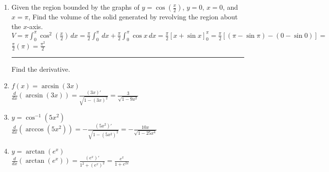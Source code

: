 \documentclass[10pt, letterpaper]{report}
\begin{document}
\begin{enumerate}
    $\int{e^{x}\cos{(2x)}}\,dx=
    \int{u}\,dv=
    2\int{e^{x}\sin{(2x)}}\,dx-2e^{x}\cos{(2x)}=
    2\int{\alpha}\,dv-2e^{x}\cos{(2x)}=
    2\left(e^{x}\sin{(2x)}-2\int{e^{x}\cos{(2x)}}\,dx\right)-2e^{x}\cos{(2x)}$ \\
    
    Let $\beta=\int{e^{x}\cos{(2x)}}\,dx$ \\
    
    $\beta=2e^{x}\sin{(2x)}-4\beta-2e^{x}\cos{(2x)}\rightarrow
    5\beta=2e^{x}\sin{(2x)}-2e^{x}\cos{(2x)}\rightarrow
    \beta=\frac{2}{5}e^{x}\sin{(2x)}-\frac{2}{5}e^{x}\cos{(2x)}$ \\
    
  \hrule
  \item{Given the region bounded by the graphs of $y=\cos{\left(\frac{x}{2}\right)}$, $y=0$, $x=0$, and $x=\pi$, Find the volume of the solid generated by revolving the region about the $x$-axis.} \\
  
    $V=\pi\int_{0}^{\pi}{\cos^{2}{\left(\frac{x}{2}\right)}}\,dx=
    \frac{\pi}{2}\int_{0}^{\pi}\,dx+\frac{\pi}{2}\int_{0}^{\pi}{\cos{x}}\,dx=
    \frac{\pi}{2}[x+\sin{x}]_{0}^{\pi}=
    \frac{\pi}{2}\left[\left(\pi - \sin{\pi}\right)-\left(0-\sin{0}\right)\right]=$ \\
    
    $\frac{\pi}{2}\left(\pi\right)=\frac{\pi^{2}}{2}$ \\
    \hrule
    
  \noindent Find the derivative. 
  \item{$f(x)=\arcsin{(3x)}$} \\
  
    $\frac{d}{dx}\left(\arcsin{(3x)}\right)=
    \frac{(3x)'}{\sqrt{1-(3x)^{2}}}=
    \frac{3}{\sqrt{1-9x^{2}}}$ \\
    \pagebreak 
    
  \item{$y=\cos^{-1}{(5x^{2})}$} \\
  
    $\frac{d}{dx}\left(\arccos{(5x^{2})}\right)=
    -\frac{\left(5x^{2}\right)'}{\sqrt{1-(5x^{2})^2}}=
    -\frac{10x}{\sqrt{1-25x^{4}}}$ \\
    
  \item{$y=\arctan{(e^{x})}$} \\
  
    $\frac{d}{dx}\left(\arctan{\left(e^{x}\right)}\right)=
    \frac{\left(e^{x}\right)'}{1^{2}+\left(e^{x}\right)^{2}}=
    \frac{e^{x}}{1+e^{2x}}$ \\
    

\end{enumerate}
\end{document}
